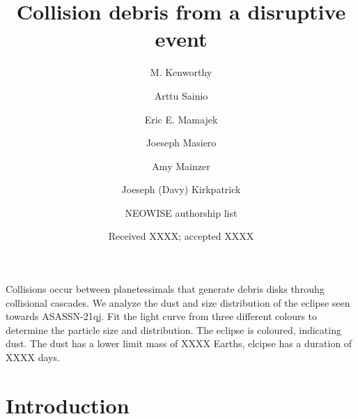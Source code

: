 \documentclass{aa}
\begin{document}
 


   \title{Collision debris from a disruptive event}

   \author{M. Kenworthy
          \and
          Arttu Sainio
          \and
          Eric E. Mamajek
          \and
          Joeseph Masiero
          \and 
          Amy Mainzer
          \and
          Joeseph (Davy) Kirkpatrick
          \and 
          NEOWISE authorship list
          }


   \date{Received XXXX; accepted XXXX}

 
  \abstract
   {Collisions occur between planetessimals that generate debris disks throuhg collisional cascades.}
   {We analyze the dust and size distribution of the eclipse seen towards ASASSN-21qj.}
   {Fit the light curve from three different colours to determine the particle size and distribution.}
   {The eclipse is coloured, indicating dust.
   The dust has a lower limit mass of XXXX Earths, elcipse has a duration of XXXX days.}
   {}


   \maketitle
%

\section{Introduction}
\end{document}
